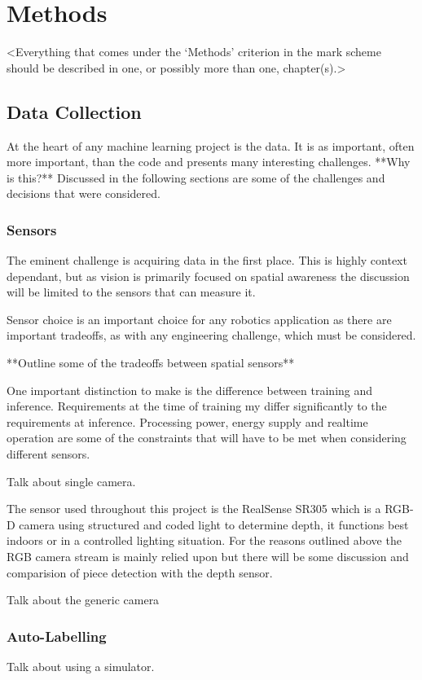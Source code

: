 \chapter{Methods}
\label{methods}

<Everything that comes under the `Methods' criterion in the mark scheme should be described in one, or possibly more than one, chapter(s).>

\section{Data Collection}
At the heart of any machine learning project is the data.  
It is as important, often more important, than the code and presents many interesting
challenges.  **Why is this?**
Discussed in the following sections are some of the challenges and decisions that were considered.

\subsection{Sensors}
The eminent challenge is acquiring data in the first place.  This is highly context 
dependant, but as vision is primarily focused on spatial awareness the discussion 
will be limited to the sensors that can measure it.

Sensor choice is an important choice for any robotics application as there are 
important tradeoffs, as with any engineering challenge, which must be considered.

**Outline some of the tradeoffs between spatial sensors**

One important distinction to make is the difference between training and inference.
Requirements at the time of training my differ significantly to the requirements at 
inference.  Processing power, energy supply and realtime operation are some
of the constraints that will have to be met when considering different sensors.

Talk about single camera. 

The sensor used throughout this project is the RealSense SR305 which is a RGB-D camera
using structured and coded light to determine depth, it functions best indoors or in a 
controlled lighting situation.  For the reasons outlined above the RGB camera stream is 
mainly relied upon but there will be some discussion and comparision of piece detection 
with the depth sensor.  

Talk about the generic camera

\subsection{Auto-Labelling}
Talk about using a simulator.

